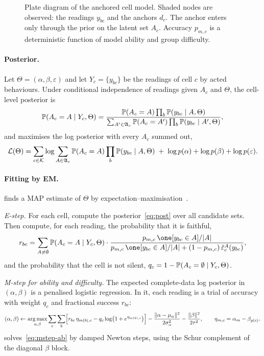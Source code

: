 \begin{figure}[t]
\centering
\resizebox{\textwidth}{!}{}
\caption{Plate diagram of the anchored cell model. Shaded nodes are observed: the readings $y_{bc}$ and the anchors $d_c$. The anchor enters only through the prior on the latent set $A_c$. Accuracy $p_{m,c}$ is a deterministic function of model ability and group difficulty.}
\label{fig:graphical}
\end{figure}

\paragraph{Posterior.} Let $\Theta=(\alpha,\beta,\varepsilon)$ and let $Y_c=\{y_{bc}\}$ be the readings of cell $c$ by acted behaviours. Under conditional independence of readings given $A_c$ and $\Theta$, the cell-level posterior is
\begin{equation}
\label{eq:post}
\mathbb{P}(A_c=A\mid Y_c,\Theta)=\frac{\mathbb{P}(A_c=A)\prod_{b}\mathbb{P}(y_{bc}\mid A,\Theta)}{\sum_{A'\in\mathfrak{A}_c}\mathbb{P}(A_c=A')\prod_{b}\mathbb{P}(y_{bc}\mid A',\Theta)},
\end{equation}
and \specdx maximises the log posterior with every $A_c$ summed out,
\begin{equation}
\label{eq:map}
\mathcal{L}(\Theta)=\sum_{c\in\mathcal{K}}\log\sum_{A\in\mathfrak{A}_c}\mathbb{P}(A_c=A)\prod_{b}\mathbb{P}(y_{bc}\mid A,\Theta)\;+\;\log p(\alpha)+\log p(\beta)+\log p(\varepsilon).
\end{equation}

\paragraph{Fitting by EM.} \specdx finds a MAP estimate of $\Theta$ by expectation--maximisation~\cite{dempster1977maximum}.

\emph{E-step.} For each cell, compute the posterior~\eqref{eq:post} over all candidate sets. Then compute, for each reading, the probability that it is faithful,
\begin{equation}
\label{eq:faithful}
r_{bc}=\sum_{A\neq\emptyset}\Prob(A_c=A\mid Y_c,\Theta)\cdot\frac{p_{m,c}\,\one[y_{bc}\in A]/|A|}{p_{m,c}\,\one[y_{bc}\in A]/|A|+(1-p_{m,c})\,\tilde\varepsilon_c^A(y_{bc})},
\end{equation}
and the probability that the cell is not silent, $q_c=1-\mathbb{P}(A_c=\emptyset\mid Y_c,\Theta)$.

\emph{M-step for ability and difficulty.} The expected complete-data log posterior in $(\alpha,\beta)$ is a penalised logistic regression. In it, each reading is a trial of accuracy with weight $q_c$ and fractional success $r_{bc}$:
\begin{equation}
\label{eq:mstep-ab}
(\alpha,\beta)\leftarrow\operatorname*{arg\,max}_{\alpha,\beta}\sum_{c}\sum_{b}\Bigl[r_{bc}\,\eta_{m(b),c}-q_c\log\bigl(1+e^{\eta_{m(b),c}}\bigr)\Bigr]-\frac{\|\alpha-\mu_\alpha\|^2}{2\sigma_\alpha^2}-\frac{\|\beta\|^2}{2\tau^2},
\qquad \eta_{m,c}=\alpha_m-\beta_{g(c)} .
\end{equation}
\specdx solves~\eqref{eq:mstep-ab} by damped Newton steps, using the Schur complement of the diagonal $\beta$ block.

